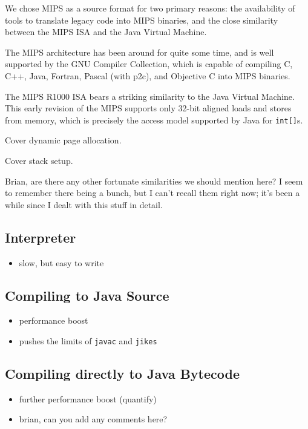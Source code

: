 \documentclass{acmconf}
\begin{document}
We chose MIPS as a source format for two primary reasons: the
availability of tools to translate legacy code into MIPS binaries, and
the close similarity between the MIPS ISA and the Java Virtual Machine.

The MIPS architecture has been around for quite some time, and is well
supported by the GNU Compiler Collection, which is capable of
compiling C, C++, Java, Fortran, Pascal (with p2c), and Objective C
into MIPS binaries.

The MIPS R1000 ISA bears a striking similarity to the Java Virtual
Machine.  This early revision of the MIPS supports only 32-bit aligned
loads and stores from memory, which is precisely the access model
supported by Java for {\tt int[]}s.

Cover dynamic page allocation.

Cover stack setup.

Brian, are there any other fortunate similarities we should mention
here?  I seem to remember there being a bunch, but I can't recall them
right now; it's been a while since I dealt with this stuff in detail.


\subsection{Interpreter}

\begin{itemize}
\item slow, but easy to write
\end{itemize}


\subsection{Compiling to Java Source}
\begin{itemize}
\item performance boost
\item pushes the limits of {\tt javac} and {\tt jikes}
\end{itemize}

\subsection{Compiling directly to Java Bytecode}
\begin{itemize}
\item further performance boost (quantify)
\item brian, can you add any comments here?
\end{itemize}
\end{document}
